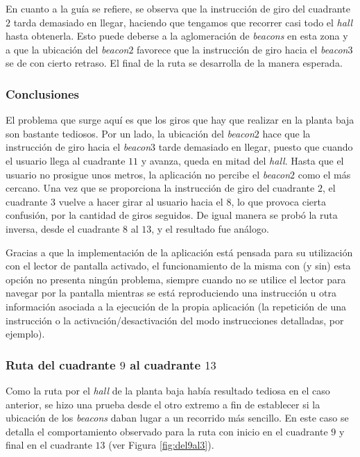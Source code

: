 En cuanto a la guía se refiere, se observa que la instrucción de giro del cuadrante $2$ tarda demasiado en llegar, haciendo que tengamos que recorrer casi todo el \textit{hall} hasta obtenerla. Esto puede deberse a la aglomeración de \textit{beacons} en esta zona y a que la ubicación del \textit{beacon$2$} favorece que la instrucción de giro hacia el \textit{beacon$3$} se de con cierto retraso. El final de la ruta se desarrolla de la manera esperada. 

\subsubsection*{Conclusiones}

El problema que surge aquí es que los giros que hay que realizar en la planta baja son bastante tediosos. Por un lado, la ubicación del \textit{beacon$2$} hace que la instrucción de giro hacia el \textit{beacon$3$} tarde demasiado en llegar, puesto que cuando el usuario llega al cuadrante $11$ y avanza, queda en mitad del \textit{hall}. Hasta que el usuario no prosigue unos metros, la aplicación no percibe el \textit{beacon$2$} como el más cercano. Una vez que se proporciona la instrucción de giro del cuadrante $2$, el cuadrante $3$ vuelve a hacer girar al usuario hacia el $8$, lo que provoca cierta confusión, por la cantidad de giros seguidos. De igual manera se probó la ruta inversa, desde el cuadrante $8$ al $13$, y el resultado fue análogo.

Gracias a que la implementación de la aplicación está pensada para su utilización con el lector de pantalla activado, el funcionamiento de la misma con (y sin) esta opción no presenta ningún problema, siempre cuando no se utilice el lector para navegar por la pantalla mientras se está reproduciendo una instrucción u otra información asociada a la ejecución de la propia aplicación (la repetición de una instrucción o la activación/desactivación del modo instrucciones detalladas, por ejemplo).


\subsubsection{Ruta del cuadrante $9$ al cuadrante $13$}
\label{subsub:9al13}

Como la ruta por el \textit{hall} de la planta baja había resultado tediosa en el caso anterior, se hizo una prueba desde el otro extremo a fin de establecer si la ubicación de los \textit{beacons} daban lugar a un recorrido más sencillo. En este caso se detalla el comportamiento observado para la ruta con inicio en el cuadrante $9$ y final en el cuadrante $13$ (ver Figura \ref{fig:del9al3}).

